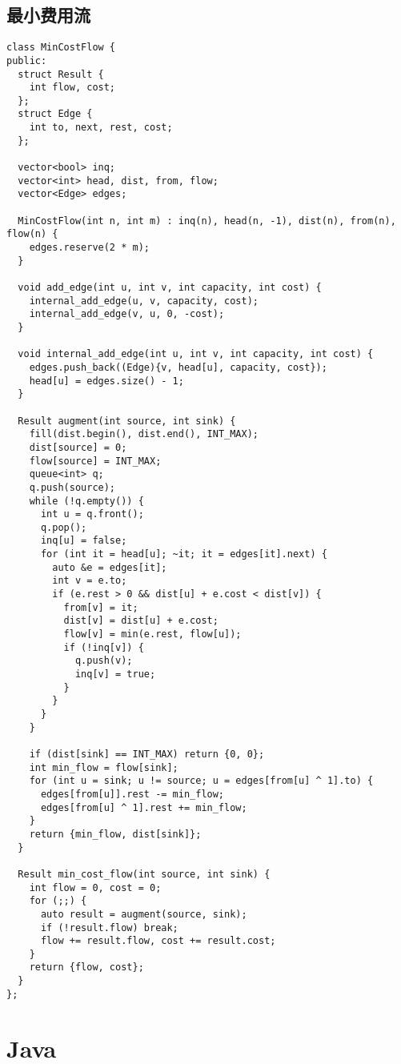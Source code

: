\documentclass[twoside]{article}
\begin{document}
\subsection{最小费用流}
\begin{lstlisting}
class MinCostFlow {
public:
  struct Result {
    int flow, cost;
  };
  struct Edge {
    int to, next, rest, cost;
  };

  vector<bool> inq;
  vector<int> head, dist, from, flow;
  vector<Edge> edges;

  MinCostFlow(int n, int m) : inq(n), head(n, -1), dist(n), from(n), flow(n) {
    edges.reserve(2 * m);
  }

  void add_edge(int u, int v, int capacity, int cost) {
    internal_add_edge(u, v, capacity, cost);
    internal_add_edge(v, u, 0, -cost);
  }

  void internal_add_edge(int u, int v, int capacity, int cost) {
    edges.push_back((Edge){v, head[u], capacity, cost});
    head[u] = edges.size() - 1;
  }

  Result augment(int source, int sink) {
    fill(dist.begin(), dist.end(), INT_MAX);
    dist[source] = 0;
    flow[source] = INT_MAX;
    queue<int> q;
    q.push(source);
    while (!q.empty()) {
      int u = q.front();
      q.pop();
      inq[u] = false;
      for (int it = head[u]; ~it; it = edges[it].next) {
        auto &e = edges[it];
        int v = e.to;
        if (e.rest > 0 && dist[u] + e.cost < dist[v]) {
          from[v] = it;
          dist[v] = dist[u] + e.cost;
          flow[v] = min(e.rest, flow[u]);
          if (!inq[v]) {
            q.push(v);
            inq[v] = true;
          }
        }
      }
    }

    if (dist[sink] == INT_MAX) return {0, 0};
    int min_flow = flow[sink];
    for (int u = sink; u != source; u = edges[from[u] ^ 1].to) {
      edges[from[u]].rest -= min_flow;
      edges[from[u] ^ 1].rest += min_flow;
    }
    return {min_flow, dist[sink]};
  }

  Result min_cost_flow(int source, int sink) {
    int flow = 0, cost = 0;
    for (;;) {
      auto result = augment(source, sink);
      if (!result.flow) break;
      flow += result.flow, cost += result.cost;
    }
    return {flow, cost};
  }
};

\end{lstlisting}

\section{Java}
\end{document}
